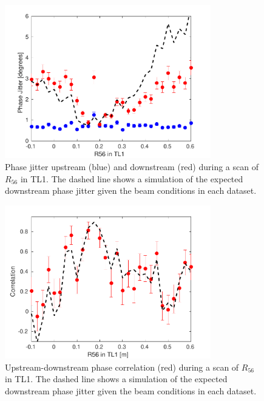 \begin{figure}
  \centering
  \includegraphics[width=0.8\textwidth]{Figures/propagation/r56Scan_meanPhaseJit}
  \caption{Phase jitter upstream (blue) and downstream (red) during a scan of \(R_{56}\) in TL1. The dashed line shows a simulation of the expected downstream phase jitter given the beam conditions in each dataset.}
  \label{f:r56Scan_meanPhaseJit}
\end{figure}

\begin{figure}
  \centering
  \includegraphics[width=0.8\textwidth]{Figures/propagation/r56Scan_correlation}
  \caption{Upstream-downstream phase correlation (red) during a scan of \(R_{56}\) in TL1. The dashed line shows a simulation of the expected downstream phase jitter given the beam conditions in each dataset.}
  \label{f:r56Scan_correlation}
\end{figure}

